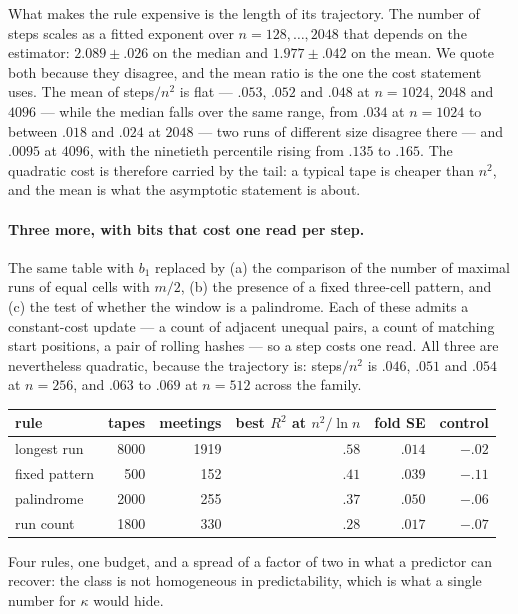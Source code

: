 \documentclass[11pt]{article}
\begin{document}
What makes the rule expensive is the length of its trajectory. The number of steps scales as
a fitted exponent over $n=128,\dots,2048$ that depends on the estimator: $2.089\pm.026$ on the median
and $1.977\pm.042$ on the mean. We quote both because they disagree, and the mean ratio is the one the
cost statement uses. The mean of steps$/n^2$ is flat --- $.053$, $.052$ and
$.048$ at $n=1024$, $2048$ and $4096$ --- while the median falls over the same range, from $.034$ at $n=1024$ to
between $.018$ and $.024$ at $2048$ --- two runs of different size disagree there --- and $.0095$ at
$4096$, with the ninetieth percentile rising from $.135$ to $.165$. The quadratic cost is
therefore carried by the tail: a typical tape is cheaper than $n^2$, and the mean is what the
asymptotic statement is about.

\paragraph{Three more, with bits that cost one read per step.} The same table with $b_1$ replaced by
(a) the comparison of the number of maximal runs of equal cells with $m/2$, (b) the presence of a
fixed three-cell pattern, and (c) the test of whether the window is a palindrome. Each of these admits
a constant-cost update --- a count of adjacent unequal pairs, a count of matching start positions, a
pair of rolling hashes --- so a step costs one read. All three are nevertheless quadratic, because the
trajectory is: steps$/n^2$ is $.046$, $.051$ and $.054$ at $n=256$, and $.063$ to $.069$ at $n=512$
across the family.

\begin{center}
\small
\begin{tabular}{lrrrrr}
\toprule
rule & tapes & meetings & best $R^2$ at $n^2/\ln n$ & fold SE & control \\
\midrule
longest run & 8000 & 1919 & $.58$ & $.014$ & $-.02$ \\
fixed pattern & 500 & 152 & $.41$ & $.039$ & $-.11$ \\
palindrome & 2000 & 255 & $.37$ & $.050$ & $-.06$ \\
run count & 1800 & 330 & $.28$ & $.017$ & $-.07$ \\
\bottomrule
\end{tabular}
\end{center}

Four rules, one budget, and a spread of a factor of two in what a predictor can recover: the class
is not homogeneous in predictability, which is what a single number for $\kappa$ would hide.
\end{document}
